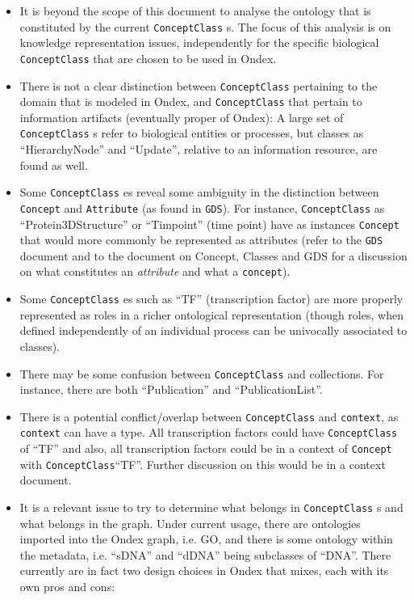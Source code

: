 \documentclass[a4paper,10pt]{article}
\newcommand{\field}[1]{\textit{#1}\xspace}
\newcommand{\term}[1]{\texttt{#1}\xspace}
\newcommand{\cc}{\term{ConceptClass}}
\newcommand{\co}{\term{Concept}}
\begin{document}
\begin{itemize}

\item It is beyond the scope of this document to analyse the ontology that is constituted by the current \cc s. The focus of this analysis is on knowledge representation issues, independently for the specific biological \cc that are chosen to be used in Ondex.

\item There is not a clear distinction between \cc pertaining to the domain that is modeled in Ondex, and \cc that pertain to information artifacts (eventually proper of Ondex):  A large set of \cc s refer to biological entities or processes, but classes as ``HierarchyNode'' and ``Update'', relative to an information resource, are found as well.

\item Some \cc es reveal some ambiguity in the distinction between \term{Concept} and \term{Attribute} (as found in \term{GDS}). For instance, \cc as  ``Protein3DStructure'' or ``Timpoint'' (time point) have as instances \co that would more commonly be represented as attributes (refer to the \term{GDS} document and to the document on Concept, Classes and GDS for a discussion on what constitutes an \field{attribute} and what a \term{concept}).

\item Some \cc es such as ``TF'' (transcription factor) are more properly represented as roles in a richer ontological representation (though roles, when defined independently of an individual process can be univocally associated to classes).

\item There may be some confusion between \cc and collections. For instance, there are both ``Publication'' and ``PublicationList''.

\item There is a potential conflict/overlap between \cc and \term{context}, as \term{context} can have a type. All transcription factors could have \cc of ``TF'' and also, all transcription factors could be in a context of \co with \cc ``TF''. Further discussion on this would be in a context document.

\item It is a relevant issue to try to determine what belongs in \cc s and what belongs in the graph. Under current usage, there  are ontologies imported into the Ondex graph, i.e. GO, and there is some ontology within the metadata, i.e. ``sDNA'' and ``dDNA'' being subclasses of ``DNA''.
There currently are in fact two design choices in Ondex that mixes, each with its own pros and cons:



\end{itemize}
\end{document}
